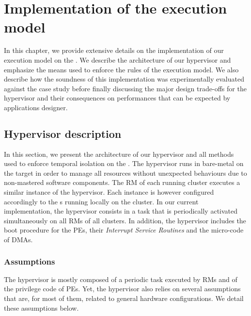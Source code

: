 \documentclass[main.tex]{subfiles}
\begin{document}
\chapter{Implementation of the execution model}
\thispagestyle{chapstyle}
\label{chap_implemExecMod}
\minitoc

In this chapter, we provide extensive details on the implementation of our
execution model on the \mppalong. We describe the architecture of our
hypervisor and emphasize the means used to enforce the rules of the execution
model. We also describe how the soundness of this implementation was
experimentally evaluated against the \rosace case study before finally
discussing the major design trade-offs for the hypervisor and their
consequences on performances that can be expected by applications designer.

\section{Hypervisor description} In this section, we present the architecture
of our hypervisor and all methods used to enforce temporal isolation on the
\mppalong. The hypervisor runs in bare-metal on the target in order to manage
all resources without unexpected behaviours due to non-mastered software
components. The RM of each running cluster executes a similar instance of the
hypervisor. Each instance is however configured accordingly to the \PN{}s
running locally on the cluster. In our current implementation, the hypervisor
consists in a task that is periodically activated simultaneously on all RMs of
all clusters. In addition, the hypervisor includes the boot procedure for the
PEs, their \emph{Interrupt Service Routines} and the micro-code of DMAs. 

\subsection{Assumptions} The hypervisor is mostly composed of a periodic task
executed by RMs and of the privilege code of PEs. Yet, the hypervisor also
relies on several assumptions that are, for most of them, related to general
hardware configurations. We detail these assumptions below.
\end{document}
